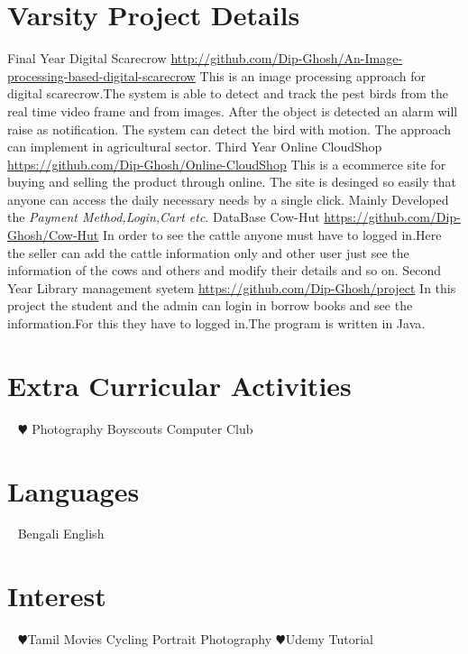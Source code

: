 \documentclass[]{cv-style}
\begin{document}
\section{Varsity Project Details}

\begin{entrylist}
  \entry
    {Final Year}
    {Digital Scarecrow}
    {\href{https://github.com/Dip-Ghosh/An-Image-processing-based-digital-scarecrow}{http://github.com/Dip-Ghosh/An-Image-processing-based-digital-scarecrow}}
    {This is an image processing approach for digital scarecrow.The system is able to detect and track the pest birds from the real time video frame and from images. After the object is detected an alarm will raise as notification. The system can detect the bird with motion. The approach can implement in agricultural sector.}
  \entry
    {Third Year}
    {Online CloudShop}
    {\href{https://github.com/Dip-Ghosh/Online-CloudShop}{https://github.com/Dip-Ghosh/Online-CloudShop}}
    {This is a ecommerce site for buying and selling the product through online. The site is desinged so easily that anyone can access the daily necessary needs by a single click. Mainly Developed the \emph{Payment Method,Login,Cart etc}.}
  \entry
    {DataBase}
    {Cow-Hut}
    {\href{https://github.com/Dip-Ghosh/Cow-Hut}
    {https://github.com/Dip-Ghosh/Cow-Hut}}
    {In order to see the cattle anyone must have to logged in.Here the seller can add the cattle information only and other user just see the information of the cows and others and modify their details and so on.}
     \entry
    {Second Year}
    {Library management syetem}
    {\href{https://github.com/Dip-Ghosh/project}
    {https://github.com/Dip-Ghosh/project}}
    {In this project the student and the admin can login in borrow books and see the information.For this they have to logged in.The program is written in Java.}
 

\end{entrylist}
\clearpage
\begin{aside}
\section{Extra Curricular Activities}
~
      {\color{red} $\varheartsuit$} Photography
      Boyscouts
      Computer Club
      ~
\section{Languages}
~
    Bengali
    English
    ~
\section{Interest}
~
       {\color{red} $\varheartsuit$}Tamil Movies
      Cycling
      Portrait Photography
        {\color{red} $\varheartsuit$}Udemy Tutorial
      ~
\end{aside}
\vspace*{.7cm}
\end{document}
